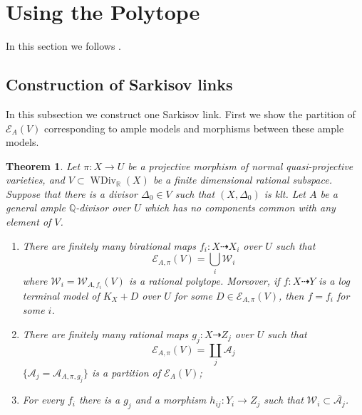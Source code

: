 \documentclass{article}
\newtheorem{thm}[defn]{Theorem}
\begin{document}
\section{Using the Polytope}\label{thirdmethod}
In this section we follows \cite{haconSarkisovProgram2012}.
\subsection{Construction of Sarkisov links}
In this subsection we construct one Sarkisov link. First we show the partition of $\mathcal{E}_{A}(V)$  corresponding to ample models and morphisms between these ample models.
\begin{thm}\label{finitemodel}
\cite[Corollary 1.1.5]{birkarExistenceMinimalModels2009}Let $\pi:X\to U$ be a projective morphism of normal quasi-projective varieties,  and $V \subset \operatorname{WDiv}_{\mathbb{R}}(X)$ be a finite dimensional rational subspace. Suppose that there is a divisor $\Delta_{0} \in V$ such that $(X,\Delta_{0})$ is klt. Let $A$ be a general ample $\mathbb{Q}$-divisor over $U$ which has no components common with any element of $V$.  
  \begin{enumerate}
    \item   There are finitely many birational maps $f_{i}:X \dashrightarrow   X_{i}$ over $U$ such that 
      \[
        \mathcal{E}_{A,\pi}(V) =\bigcup_{i}\mathcal{W}_{i}
      \]
      where  $\mathcal{W}_{i}=\mathcal{W}_{A,f_{i}}(V)$ is a rational polytope. Moreover, if  $f:X \dashrightarrow  Y$ is a  log terminal model of $K_{X}+D$ over $U$ for some $D \in \mathcal{E}_{A,\pi}(V)$, then  $f=f_{i}$ for some $i$.  

    \item   There are finitely many rational maps $g_{j}:X \dashrightarrow  Z_{j}$ over $U$ such that
      \[
        \mathcal{E}_{A,\pi}(V) =\coprod_{j}\mathcal{A}_{j}
      \]
      $ \{\mathcal{A}_j=\mathcal{A}_{A,\pi,g_j}\} $ is a partition of $ \mathcal{E}_{A}(V) $;
    \item  For every  $f_{i}$ there is a $g_{j}$ and a morphism $h_{ij}:Y_{i}\to Z_{j}$ such that $\mathcal{W}_{i} \subset \overline{\mathcal{A}_{j}}$.   
  \end{enumerate}
\end{thm}
\end{document}
